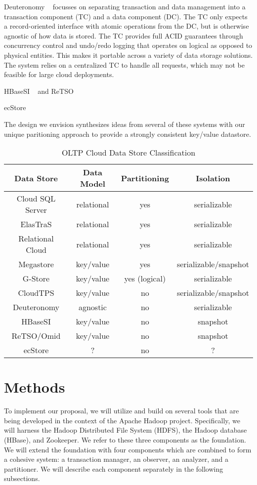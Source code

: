 \documentclass[10pt,final,journal]{IEEEtran}
\begin{document}
Deuteronomy ~\cite{Levandoski:2011:8530161} focusses on separating transaction and data management into a transaction component (TC) and a data component (DC). The TC only expects a record-oriented interface with atomic operations from the DC, but is otherwise agnostic of how data is stored. The TC provides full ACID guarantees through concurrency control and undo/redo logging that operates on logical as opposed to physical entities. This makes it portable across a variety of data storage solutions. The system relies on a centralized TC to handle all requests, which may not be feasible for large cloud deployments.

HBaseSI ~\cite{} and ReTSO ~\cite{}

ecStore ~\cite{}

The design we envision synthesizes ideas from several of these systems with our unique paritioning approach to provide a strongly consistent key/value datastore.

\begin{table}[!t]
\renewcommand{\arraystretch}{1.3}
\caption{OLTP Cloud Data Store Classification}
\label{classification}
\centering
\begin{tabular}{|c|c|c|c|}
\hline
\bfseries Data Store  & \bfseries Data Model & \bfseries  Partitioning & \bfseries Isolation \\
\hline
\hline
Cloud SQL Server & relational & yes & serializable \\
ElasTraS & relational & yes & serializable \\
Relational Cloud & relational & yes & serializable \\
Megastore & key/value & yes & serializable/snapshot \\
G-Store & key/value & yes (logical) & serializable \\
CloudTPS & key/value & no & serializable/snapshot \\
Deuteronomy & agnostic & no &serializable \\
HBaseSI & key/value & no & snapshot \\
ReTSO/Omid & key/value & no & snapshot \\
ecStore & ? & no & ? \\
\hline
\end{tabular}
\end{table}



\section{Methods}
To implement our proposal, we will utilize and build on several tools that are being developed in the context of the Apache Hadoop project. Specifically, we will harness the Hadoop Distributed File System (HDFS), the Hadoop database (HBase), and Zookeeper. We refer to these three components as the foundation. We will extend the foundation with four components which are combined to form a cohesive system: a transaction manager, an observer, an analyzer, and a partitioner. We will describe each component separately in the following subsections.
\end{document}
